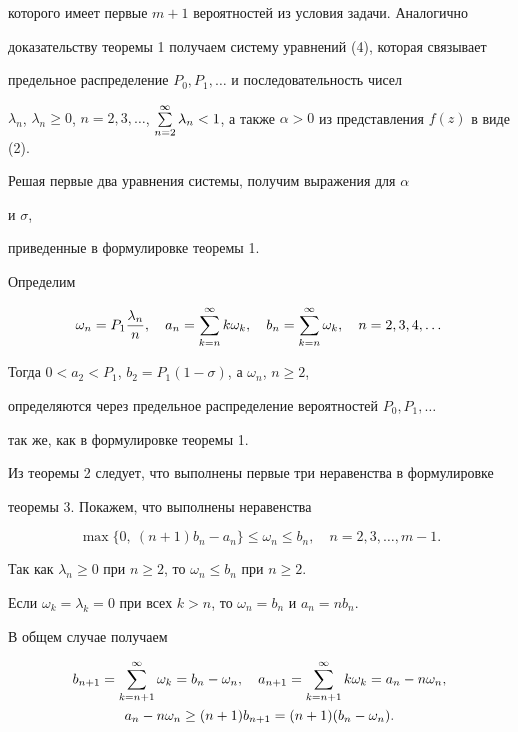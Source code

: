 которого имеет первые $m+1$ вероятностей из условия задачи. Аналогично


доказательству теоремы 1 получаем систему уравнений (4), которая связывает


предельное распределение $P_0, P_1, \dotsc $ и последовательность чисел


$\lambda_n$, $\lambda_n\geq 0$, $n=2, 3, \dotsc$, $\Su {n=2}^{\infty }


\lambda_n<1$, а также $\alpha >0$ из представления $f(z)$ в виде (2).


Решая первые два уравнения системы, получим выражения для $\alpha$


и $\sigma $,


приведенные в формулировке теоремы 1.





Определим


$$


\omega_n=P_1 \frac {\lambda_n}{n},\quad a_n=\Su {k=n}^{\infty }k\omega_k,


\quad b_n=\Su {k=n}^{\infty }\omega_k,\quad n=2, 3, 4, \dotsc


$$


Тогда $0<a_2<P_1$, $b_2=P_1(1-\sigma)$, а $\omega_n$, $n\geq 2$,


определяются через предельное распределение вероятностей $P_0, P_1, \dotsc $


так же, как в формулировке теоремы 1.





Из теоремы 2 следует, что выполнены первые три неравенства в формулировке


теоремы 3. Покажем, что выполнены неравенства


\begin{equation}


\max\{0, \ (n+1)b_n-a_n\}\leq \omega_n\leq b_n,\quad n=2, 3, \dotsc,m-1.


\end{equation}


Так как $\lambda_n\geq 0$ при $n\geq 2$, то $\omega_n\leq b_n$ при $n\geq 2$.


Если $\omega_k=\lambda_k=0$ при всех $k>n$, то $\omega_n=b_n$ и $a_n=nb_n$.


В общем случае получаем


\begin{gather*}


b_{n+1}=\Su {k=n+1}^{\infty }\omega_k=b_n-\omega_n,


\quad a_{n+1}=\Su {k=n+1}^{\infty }k\omega_k=a_n-n\omega_n,\\


%


a_n-n\omega_n\geq (n+1)b_{n+1}=(n+1)(b_n-\omega_n).


\end{gather*}


